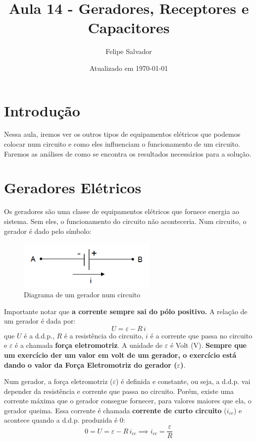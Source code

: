 \documentclass[12pt]{extarticle}
\title{Aula 14 - Geradores, Receptores e Capacitores}
\author{Felipe Salvador}
\date{Atualizado em \today}
\newcommand{\<}{\langle}
\renewcommand{\>}{\rangle}
\theoremstyle{definition}
\begin{document}
\maketitle

\section{Introdução}

Nessa aula, iremos ver os outros tipos de equipamentos elétricos que podemos colocar num circuito e como eles influenciam o funcionamento de um circuito. Faremos as análises de como se encontra os resultados necessários para a solução.

\section{Geradores Elétricos}
Os geradores são uma classe de equipamentos elétricos que fornece energia ao sistema. Sem eles, o funcionamento do circuito não aconteceria. Num circuito, o gerador é dado pelo símbolo:

\begin{figure}[H]
    \centering
    \includegraphics[width=0.6\textwidth]{a1.PNG}
    \caption{Diagrama de um gerador num circuito}
    \label{fig:gerador}
\end{figure}

Importante notar que \textbf{a corrente sempre sai do pólo positivo.} A relação de um gerador é dada por:
\begin{equation}
    U= \varepsilon - R\,i
\end{equation}
\noindent que $U$ é a d.d.p., $R$ é a resistência do circuito, $i$ é a corrente que passa no circuito e $\varepsilon$ é a chamada \textbf{força eletromotriz}. A unidade de $\varepsilon$ é Volt (V). \textbf{Sempre que um exercício der um valor em volt de um gerador, o exercício está dando o valor da Força Eletromotriz do gerador ($\varepsilon$)}.

Num gerador, a força eletromotriz ($\varepsilon$) é definida e constante, ou seja, a d.d.p. vai depender da resistência e corrente que passa no circuito. Porém, existe uma corrente máxima que o gerador consegue fornecer, para valores maiores que ela, o gerador queima. Essa corrente é chamada \textbf{corrente de curto circuito} ($i_{cc}$) e acontece quando a d.d.p. produzida é 0:
\begin{equation}
    0= U = \varepsilon - R\,i_{cc} \implies \boxed{ i_{cc} = \frac{\varepsilon}{R}}
\end{equation}
\end{document}
